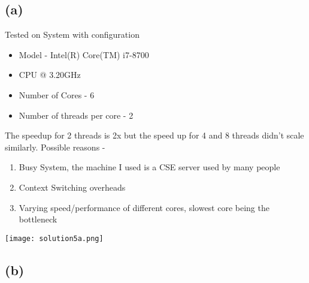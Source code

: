 \documentclass[a4paper]{article}
\begin{document}
\subsection{(a)}
\begin{minipage}{0.4\textwidth}
Tested on System with configuration
\begin{itemize}
\item Model - Intel(R) Core(TM) i7-8700 
\item CPU @ 3.20GHz 
\item Number of Cores - 6
\item Number of threads per core - 2
\end{itemize}

The speedup for 2 threads is 2x but the speed up for 4 and 8 threads didn't scale similarly. Possible reasons - 
\begin{enumerate}
\item Busy System, the machine I used is a CSE server used by many people
\item Context Switching overheads
\item Varying speed/performance of different cores, slowest core being the bottleneck
\end{enumerate}

\end{minipage}
\begin{minipage}{0.6\textwidth}
\texttt{[image: solution5a.png]}
\end{minipage}

\subsection{(b)}
\end{document}
